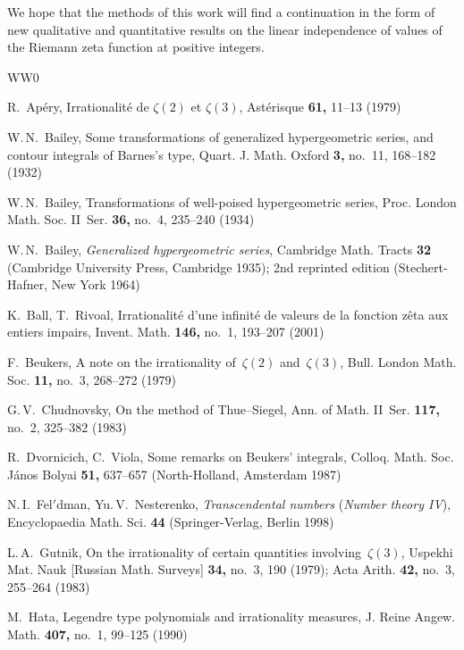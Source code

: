 \documentclass[a4paper,twoside]{article}
\numberwithin{equation}{section}
\renewcommand{\[}{\lfloor}
\renewcommand{\]}{\rfloor}
\newcommand{\<}{\langle}
\renewcommand{\>}{\rangle}
\begin{document}
\medskip
We hope that the methods of this work will find a continuation
in the form of new qualitative and quantitative results
on the linear independence of values of the Riemann zeta function
at positive integers.

\begin{thebibliography}{WW0}

R.~Ap\'ery,
Irrationalit\'e de $\zeta(2)$ et $\zeta(3)$,
Ast\'erisque \textbf{61,} 11--13 (1979)

W.\,N.~Bailey,
Some transformations of generalized hypergeometric series,
and contour integrals of Barnes's type,
Quart. J. Math. Oxford \textbf{3,} no.~11, 168--182 (1932)

W.\,N.~Bailey,
Transformations of well-poised hypergeometric series,
Proc. London Math. Soc. II~Ser. \textbf{36,} no.~4, 235--240 (1934)

W.\,N.~Bailey,
\textit{Generalized hypergeometric series},
Cambridge Math. Tracts \textbf{32}
(Cambridge University Press, Cambridge 1935);
2nd reprinted edition
(Stechert-Hafner, New York 1964)

K.~Ball, T.~Rivoal,
Irrationalit\'e d'une infinit\'e de valeurs
de la fonction z\^eta aux entiers impairs,
Invent. Math. \textbf{146,} no.~1, 193--207 (2001)

F.~Beukers,
A note on the irrationality of~$\zeta(2)$ and~$\zeta(3)$,
Bull. London Math. Soc. \textbf{11,} no.~3, 268--272 (1979)

G.\,V.~Chudnovsky,
On the method of Thue--Siegel,
Ann. of Math. II~Ser. \textbf{117,} no.~2, 325--382 (1983)

R.~Dvornicich, C.~Viola,
Some remarks on Beukers' integrals,
Colloq. Math. Soc. J\'anos Bolyai \textbf{51,} 637--657
(North-Holland, Amsterdam 1987)

N.\,I.~Fel$'\!$dman, Yu.\,V.~Nesterenko,
\textit{Transcendental numbers\/} (\textit{Number theory IV\/}),
Encyclopaedia Math. Sci. \textbf{44}
(Springer-Verlag, Berlin 1998)

L.\,A.~Gutnik,
On the irrationality of certain quantities involving~$\zeta(3)$,
Uspekhi Mat. Nauk [Russian Math. Surveys] \textbf{34,} no.~3, 190 (1979);
Acta Arith. \textbf{42,} no.~3, 255--264 (1983)

M.~Hata,
Legendre type polynomials and irrationality measures,
J. Reine Angew. Math. \textbf{407,} no.~1, 99--125 (1990)


\end{thebibliography}
\end{document}
